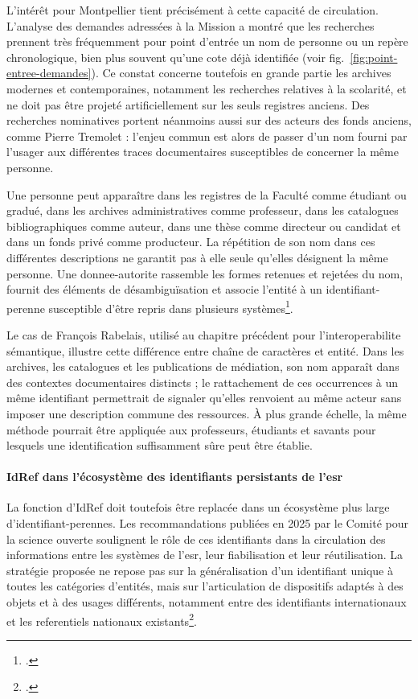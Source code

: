 L'intérêt pour Montpellier tient précisément à cette capacité de circulation. L'analyse des demandes adressées à la Mission a montré que les recherches prennent très fréquemment pour point d'entrée un nom de personne ou un repère chronologique, bien plus souvent qu'une cote déjà identifiée (voir fig.~\ref{fig:point-entree-demandes}). Ce constat concerne toutefois en grande partie les archives modernes et contemporaines, notamment les recherches relatives à la scolarité, et ne doit pas être projeté artificiellement sur les seuls registres anciens. Des recherches nominatives portent néanmoins aussi sur des acteurs des fonds anciens, comme Pierre Tremolet : l'enjeu commun est alors de passer d'un nom fourni par l'usager aux différentes traces documentaires susceptibles de concerner la même personne.

Une personne peut apparaître dans les registres de la Faculté comme étudiant ou gradué, dans les archives administratives comme professeur, dans les catalogues bibliographiques comme auteur, dans une thèse comme directeur ou candidat et dans un fonds privé comme producteur. La répétition de son nom dans ces différentes descriptions ne garantit pas à elle seule qu'elles désignent la même personne. Une \gls{donnee-autorite} rassemble les formes retenues et rejetées du nom, fournit des éléments de désambiguïsation et associe l'entité à un \gls{identifiant-perenne} susceptible d'être repris dans plusieurs systèmes\footcite{MistralIdRef2022}.

Le cas de François Rabelais, utilisé au chapitre précédent pour l'\gls{interoperabilite} sémantique, illustre cette différence entre chaîne de caractères et entité. Dans les archives, les catalogues et les publications de médiation, son nom apparaît dans des contextes documentaires distincts ; le rattachement de ces occurrences à un même identifiant permettrait de signaler qu'elles renvoient au même acteur sans imposer une description commune des ressources. À plus grande échelle, la même méthode pourrait être appliquée aux professeurs, étudiants et savants pour lesquels une identification suffisamment sûre peut être établie.


\paragraph{IdRef dans l'écosystème des identifiants persistants de l'\gls{esr}}

La fonction d'IdRef doit toutefois être replacée dans un écosystème plus large d'\glspl{identifiant-perenne}. Les recommandations publiées en 2025 par le Comité pour la science ouverte soulignent le rôle de ces identifiants dans la circulation des informations entre les systèmes de l'\gls{esr}, leur fiabilisation et leur réutilisation. La stratégie proposée ne repose pas sur la généralisation d'un identifiant unique à toutes les catégories d'entités, mais sur l'articulation de dispositifs adaptés à des objets et à des usages différents, notamment entre des identifiants internationaux et les \glspl{referentiel} nationaux existants\footcite{StollLamotte2025}.

